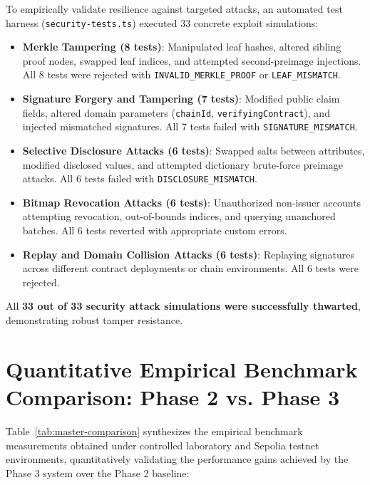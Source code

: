 To empirically validate resilience against targeted attacks, an automated test harness (\texttt{security-tests.ts}) executed 33 concrete exploit simulations:
\begin{itemize}
    \item \textbf{Merkle Tampering (8 tests)}: Manipulated leaf hashes, altered sibling proof nodes, swapped leaf indices, and attempted second-preimage injections. All 8 tests were rejected with \texttt{INVALID\_MERKLE\_PROOF} or \texttt{LEAF\_MISMATCH}.
    \item \textbf{Signature Forgery and Tampering (7 tests)}: Modified public claim fields, altered domain parameters (\texttt{chainId}, \texttt{verifyingContract}), and injected mismatched signatures. All 7 tests failed with \texttt{SIGNATURE\_MISMATCH}.
    \item \textbf{Selective Disclosure Attacks (6 tests)}: Swapped salts between attributes, modified disclosed values, and attempted dictionary brute-force preimage attacks. All 6 tests failed with \texttt{DISCLOSURE\_MISMATCH}.
    \item \textbf{Bitmap Revocation Attacks (6 tests)}: Unauthorized non-issuer accounts attempting revocation, out-of-bounds indices, and querying unanchored batches. All 6 tests reverted with appropriate custom errors.
    \item \textbf{Replay and Domain Collision Attacks (6 tests)}: Replaying signatures across different contract deployments or chain environments. All 6 tests were rejected.
\end{itemize}

All \textbf{33 out of 33 security attack simulations were successfully thwarted}, demonstrating robust tamper resistance.

\section{Quantitative Empirical Benchmark Comparison: Phase 2 vs. Phase 3}

Table~\ref{tab:master-comparison} synthesizes the empirical benchmark measurements obtained under controlled laboratory and Sepolia testnet environments, quantitatively validating the performance gains achieved by the Phase 3 system over the Phase 2 baseline:

